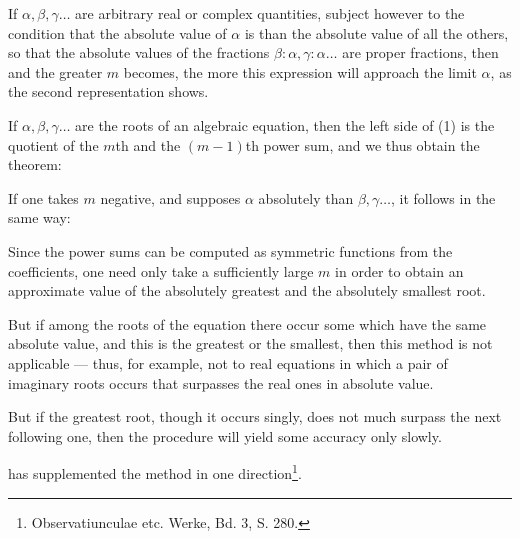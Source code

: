 If $\alpha, \beta, \gamma \ldots$ are arbitrary real or complex quantities, subject however to the condition that the absolute value of $\alpha$ is  than the absolute value of all the others, so that the absolute values of the fractions $\beta:\alpha, \gamma:\alpha \ldots$ are proper fractions, then
and the greater $m$ becomes, the more this expression will approach the limit $\alpha$, as the second representation shows.

If $\alpha, \beta, \gamma \ldots$ are the roots of an algebraic equation, then the left side of (1) is the quotient of the $m$th and the $(m-1)$th power sum, and we thus obtain the theorem:

\begin{center}
\end{center}

If one takes $m$ negative, and supposes $\alpha$ absolutely  than $\beta, \gamma \ldots$, it follows in the same way:

\begin{center}
\end{center}

Since the power sums can be computed as symmetric functions from the coefficients, one need only take a sufficiently large $m$ in order to obtain an approximate value of the absolutely greatest and the absolutely smallest root.

But if among the roots of the equation there occur some which have the same absolute value, and this is the greatest or the smallest, then this method is not applicable — thus, for example, not to real equations in which a pair of imaginary roots occurs that surpasses the real ones in absolute value.

But if the greatest root, though it occurs singly, does not much surpass the next following one, then the procedure will yield some accuracy only slowly.

 has supplemented the  method in one direction\footnote{Observatiunculae etc. Werke, Bd. 3, S. 280.}.
